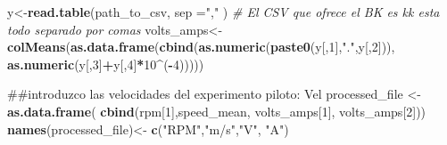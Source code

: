 \documentclass[]{article}
\newenvironment{Shaded}{\begin{snugshade}}{\end{snugshade}}
\newcommand{\KeywordTok}[1]{\textcolor[rgb]{0.13,0.29,0.53}{\textbf{#1}}}
\newcommand{\DataTypeTok}[1]{\textcolor[rgb]{0.13,0.29,0.53}{#1}}
\newcommand{\DecValTok}[1]{\textcolor[rgb]{0.00,0.00,0.81}{#1}}
\newcommand{\StringTok}[1]{\textcolor[rgb]{0.31,0.60,0.02}{#1}}
\newcommand{\CommentTok}[1]{\textcolor[rgb]{0.56,0.35,0.01}{\textit{#1}}}
\newcommand{\OperatorTok}[1]{\textcolor[rgb]{0.81,0.36,0.00}{\textbf{#1}}}
\newcommand{\NormalTok}[1]{#1}
\begin{document}
\begin{Shaded}
\begin{Highlighting}[]
\NormalTok{  y<-}\KeywordTok{read.table}\NormalTok{(path_to_csv, }\DataTypeTok{sep =}\StringTok{","}\NormalTok{ )}
  \CommentTok{# El CSV que ofrece el BK es kk esta todo separado por comas}
\NormalTok{  volts_amps<-}\StringTok{ }\KeywordTok{colMeans}\NormalTok{(}\KeywordTok{as.data.frame}\NormalTok{(}\KeywordTok{cbind}\NormalTok{(}\KeywordTok{as.numeric}\NormalTok{(}\KeywordTok{paste0}\NormalTok{(y[,}\DecValTok{1}\NormalTok{],}\StringTok{"."}\NormalTok{,y[,}\DecValTok{2}\NormalTok{])),}
                                            \KeywordTok{as.numeric}\NormalTok{(y[,}\DecValTok{3}\NormalTok{]}\OperatorTok{+}\NormalTok{y[,}\DecValTok{4}\NormalTok{]}\OperatorTok{*}\DecValTok{10}\OperatorTok{^}\NormalTok{(}\OperatorTok{-}\DecValTok{4}\NormalTok{)))))}
  
\NormalTok{  ##introduzco las velocidades del experimento piloto: Vel}
\NormalTok{  processed_file <-}\KeywordTok{as.data.frame}\NormalTok{( }\KeywordTok{cbind}\NormalTok{(rpm[}\DecValTok{1}\NormalTok{],speed_mean, volts_amps[}\DecValTok{1}\NormalTok{], volts_amps[}\DecValTok{2}\NormalTok{]))}
  \KeywordTok{names}\NormalTok{(processed_file)<-}\StringTok{ }\KeywordTok{c}\NormalTok{(}\StringTok{"RPM"}\NormalTok{,}\StringTok{"m/s"}\NormalTok{,}\StringTok{"V"}\NormalTok{, }\StringTok{"A"}\NormalTok{)}
  

\end{Highlighting}
\end{Shaded}
\end{document}
